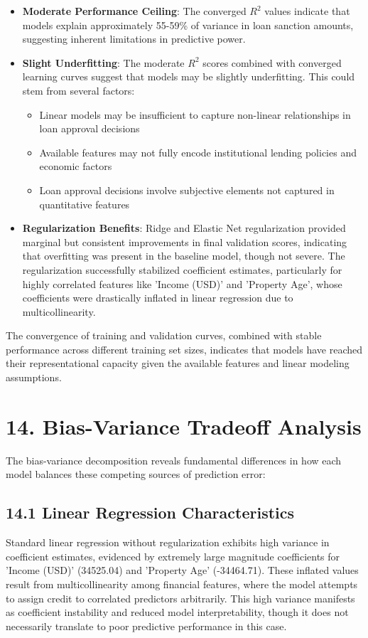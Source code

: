 \documentclass[11pt]{article}
\begin{document}
\begin{itemize}
\item \textbf{Moderate Performance Ceiling}: The converged $R^2$ values indicate that models explain approximately 55-59\% of variance in loan sanction amounts, suggesting inherent limitations in predictive power.

\item \textbf{Slight Underfitting}: The moderate $R^2$ scores combined with converged learning curves suggest that models may be slightly underfitting. This could stem from several factors:
\begin{itemize}
\item Linear models may be insufficient to capture non-linear relationships in loan approval decisions
\item Available features may not fully encode institutional lending policies and economic factors
\item Loan approval decisions involve subjective elements not captured in quantitative features
\end{itemize}

\item \textbf{Regularization Benefits}: Ridge and Elastic Net regularization provided marginal but consistent improvements in final validation scores, indicating that overfitting was present in the baseline model, though not severe. The regularization successfully stabilized coefficient estimates, particularly for highly correlated features like 'Income (USD)' and 'Property Age', whose coefficients were drastically inflated in linear regression due to multicollinearity.
\end{itemize}

The convergence of training and validation curves, combined with stable performance across different training set sizes, indicates that models have reached their representational capacity given the available features and linear modeling assumptions.

\section*{14. Bias-Variance Tradeoff Analysis}

The bias-variance decomposition reveals fundamental differences in how each model balances these competing sources of prediction error:

\subsection*{14.1 Linear Regression Characteristics}
Standard linear regression without regularization exhibits high variance in coefficient estimates, evidenced by extremely large magnitude coefficients for 'Income (USD)' (34525.04) and 'Property Age' (-34464.71). These inflated values result from multicollinearity among financial features, where the model attempts to assign credit to correlated predictors arbitrarily. This high variance manifests as coefficient instability and reduced model interpretability, though it does not necessarily translate to poor predictive performance in this case.
\end{document}
